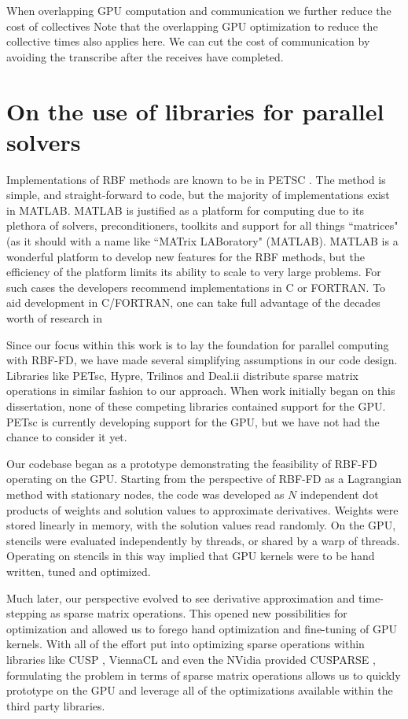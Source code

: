 When overlapping GPU computation and communication we further reduce the cost of collectives 
Note that the overlapping GPU optimization to reduce the collective times also applies here. We can cut the cost of communication by avoiding the transcribe after the receives have completed. 


\section{On the use of libraries for parallel solvers}


Implementations of RBF methods are known to be in PETSC \cite{Yokota2010}. The method is simple, and straight-forward to code, but the majority of implementations exist in MATLAB. MATLAB is justified as a platform for computing due to its plethora of solvers, preconditioners, toolkits and support for all things ``matrices" (as it should with a name like ``MATrix LABoratory" (MATLAB). MATLAB is a wonderful platform to develop new features for the RBF methods, but the efficiency of the platform limits its ability to scale to very large problems. For such cases the developers recommend implementations in C or FORTRAN. To aid development in C/FORTRAN, one can take full advantage of the decades worth of research in

Since our focus within this work is to lay the foundation for parallel computing
with RBF-FD, we have made several simplifying assumptions in our code design.
Libraries like PETsc, Hypre, Trilinos and Deal.ii distribute sparse matrix
operations in similar fashion to our approach. When work initially began on this
dissertation, none of these competing libraries contained support for the GPU.
PETsc is currently developing support for the GPU, but we have not had the
chance to consider it yet. 

Our codebase began as a prototype demonstrating the feasibility of RBF-FD
operating on the GPU. Starting from the perspective of RBF-FD as a Lagrangian
method with stationary nodes, the code was developed as $N$ independent dot
products of weights and solution values to approximate derivatives. Weights were
stored linearly in memory, with the solution values read randomly. On the GPU,
stencils were evaluated independently by threads, or shared by a warp of
threads. Operating on stencils in this way implied that GPU kernels were to be
hand written, tuned and optimized. 

Much later, our perspective evolved to see derivative approximation and
time-stepping as sparse matrix operations. This opened new possibilities for
optimization and allowed us to forego hand optimization and fine-tuning of GPU
kernels. With all of the effort put into optimizing sparse operations within
libraries like CUSP \cite{Bell2009}, ViennaCL \cite{Rupp2010} and even the
NVidia provided CUSPARSE \cite{CUSPARSE}, formulating the problem in terms of
sparse matrix operations allows us to quickly prototype on the GPU and leverage
all of the optimizations available within the third party libraries. 

 


